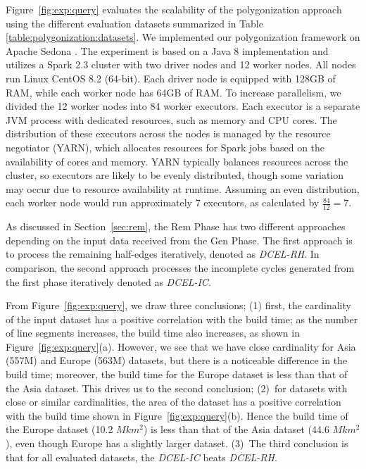 Figure~\ref{fig:exp:query} evaluates the scalability of the polygonization approach using the different evaluation datasets summarized in Table \ref{table:polygonization:datasets}. 
We implemented our polygonization framework on Apache Sedona \cite{YZS18}. The experiment is based on a Java 8 implementation and utilizes a Spark 2.3 cluster with two driver nodes and 12 worker nodes. All nodes run Linux CentOS 8.2 (64-bit). Each driver node is equipped with 128GB of RAM, while each worker node has 64GB of RAM. To increase parallelism, we divided the 12 worker nodes into 84 worker executors. Each executor is a separate JVM process with dedicated resources, such as memory and CPU cores. The distribution of these executors across the nodes is managed by the resource negotiator (YARN), which allocates resources for Spark jobs based on the availability of cores and memory. YARN typically balances resources across the cluster, so executors are likely to be evenly distributed, though some variation may occur due to resource availability at runtime. Assuming an even distribution, each worker node would run approximately 7 executors, as calculated by $\frac{84}{12} = 7$.

As discussed in Section~\ref{sec:rem}, the Rem Phase has two different approaches depending on the input data received from the Gen Phase. The first approach is to process the remaining half-edges iteratively, denoted as \textit{DCEL-RH}. In comparison, the second approach processes the incomplete cycles generated from the first phase iteratively denoted as \textit{DCEL-IC}.

From Figure~\ref{fig:exp:query}, we draw three conclusions; 
(1) first, the cardinality of the input dataset has a positive correlation with the build time; as the number of line segments increases, the build time also increases, as shown in Figure~\ref{fig:exp:query}(a). However, we see that we have close cardinality for Asia (557M) and Europe (563M) datasets, but there is a noticeable difference in the build time; moreover, the build time for the Europe dataset is less than that of the Asia dataset. 
This drives us to the second conclusion;  
(2)~for datasets with close or similar cardinalities, the area of the dataset has a positive correlation with the build time shown in Figure~\ref{fig:exp:query}(b). 
Hence the build time of the Europe dataset (10.2 $Mkm^2$) is less than that of the Asia dataset (44.6 $Mkm^2$), even though Europe has a slightly larger dataset.
(3)~The third conclusion is that for all evaluated datasets, the \textit{DCEL-IC} beats \textit{DCEL-RH}.

